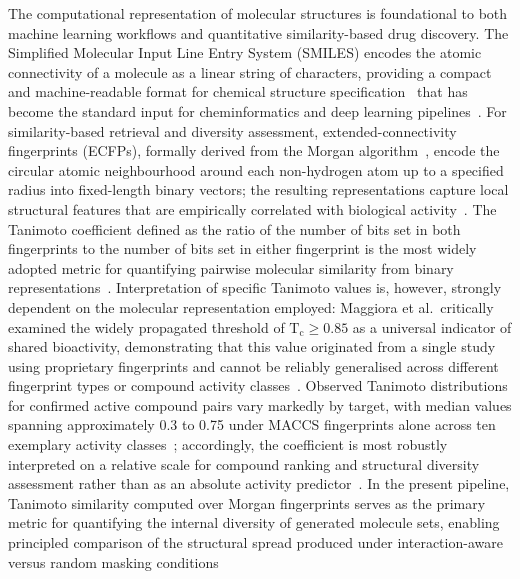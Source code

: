 \documentclass[a4paper,12pt]{article}
\begin{document}
The computational representation of molecular structures is foundational to
both machine learning workflows and quantitative similarity-based drug
discovery.
The Simplified Molecular Input Line Entry System (SMILES) encodes the atomic
connectivity of a molecule as a linear string of characters, providing a
compact and machine-readable format for chemical structure
specification~\cite{Weininger1988} that has become the standard input for
cheminformatics and deep learning
pipelines~\cite{chithrananda2020chemberta, Ross2022}.
For similarity-based retrieval and diversity assessment,
extended-connectivity fingerprints (ECFPs), formally derived from the Morgan
algorithm~\cite{morgan1965}, encode the circular atomic neighbourhood around
each non-hydrogen atom up to a specified radius into fixed-length binary
vectors; the resulting representations capture local structural features that
are empirically correlated with biological activity~\cite{RogersHahn2010}.
The Tanimoto coefficient defined as the ratio of the number of bits set in
both fingerprints to the number of bits set in either fingerprint is the
most widely adopted metric for quantifying pairwise molecular similarity from
binary representations~\cite{Bajusz2015}.
Interpretation of specific Tanimoto values is, however, strongly dependent
on the molecular representation employed: Maggiora et al.\ critically
examined the widely propagated threshold of $\mathrm{T_c} \geq 0.85$ as a
universal indicator of shared bioactivity, demonstrating that this value
originated from a single study using proprietary fingerprints and cannot be
reliably generalised across different fingerprint types or compound activity
classes~\cite{maggiora2014}.
Observed Tanimoto distributions for confirmed active compound pairs vary
markedly by target, with median values spanning approximately 0.3 to 0.75
under MACCS fingerprints alone across ten exemplary activity
classes~\cite{maggiora2014}; accordingly, the coefficient is most robustly
interpreted on a relative scale for compound ranking and structural diversity
assessment rather than as an absolute activity predictor~\cite{maggiora2014}. In the present pipeline, Tanimoto similarity computed over Morgan fingerprints serves as the primary metric for quantifying the internal diversity of generated molecule sets, enabling principled comparison of the structural spread produced under interaction-aware versus random masking conditions
\end{document}

